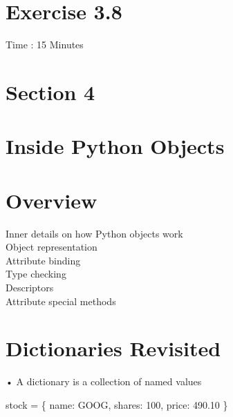 \documentclass[
  letterpaper,
  DIV=11,
  numbers=noendperiod]{scrreprt}
\newenvironment{Shaded}{\begin{snugshade}}{\end{snugshade}}
\newcommand{\DecValTok}[1]{\textcolor[rgb]{0.68,0.00,0.00}{#1}}
\newcommand{\FloatTok}[1]{\textcolor[rgb]{0.68,0.00,0.00}{#1}}
\newcommand{\NormalTok}[1]{\textcolor[rgb]{0.00,0.23,0.31}{#1}}
\newcommand{\OperatorTok}[1]{\textcolor[rgb]{0.37,0.37,0.37}{#1}}
\newcommand{\StringTok}[1]{\textcolor[rgb]{0.13,0.47,0.30}{#1}}
\begin{document}
\chapter{Exercise 3.8}\label{exercise-3.8}

Time : 15 Minutes


\chapter{Section 4}\label{section-4}


\chapter{Inside Python Objects}\label{inside-python-objects}


\chapter{Overview}\label{overview-1}

Inner details on how Python objects work\\
Object representation\\
Attribute binding\\
Type checking\\
Descriptors\\
Attribute special methods


\chapter{Dictionaries Revisited}\label{dictionaries-revisited}

• A dictionary is a collection of named values

\begin{Shaded}
\begin{Highlighting}[]
\NormalTok{stock }\OperatorTok{=} \OperatorTok{\{}
    \StringTok{\textquotesingle{}name\textquotesingle{}}\OperatorTok{:} \StringTok{\textquotesingle{}GOOG\textquotesingle{}}\OperatorTok{,}
    \StringTok{\textquotesingle{}shares\textquotesingle{}}\OperatorTok{:} \DecValTok{100}\OperatorTok{,}
    \StringTok{\textquotesingle{}price\textquotesingle{}}\OperatorTok{:} \FloatTok{490.10}
\OperatorTok{\}} 
\end{Highlighting}
\end{Shaded}
\end{document}

